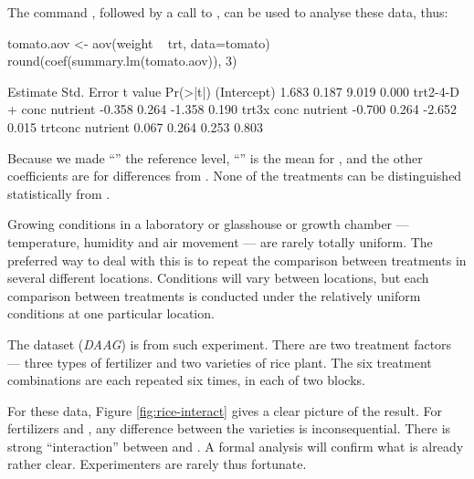 The command , followed by a call to ,
can be used to analyse these data, thus:
\begin{Schunk}
\begin{Sinput}
tomato.aov <- aov(weight ~ trt, data=tomato)
round(coef(summary.lm(tomato.aov)), 3)
\end{Sinput}
\end{Schunk}
\begin{fullwidth}

\begin{Schunk}
\begin{Soutput}
                         Estimate Std. Error t value Pr(>|t|)
(Intercept)                 1.683      0.187   9.019    0.000
trt2-4-D + conc nutrient   -0.358      0.264  -1.358    0.190
trt3x conc nutrient        -0.700      0.264  -2.652    0.015
trtconc nutrient            0.067      0.264   0.253    0.803
\end{Soutput}
\end{Schunk}

\end{fullwidth}
Because we made ``'' the reference level,
``'' is the mean for , and the
other coefficients are for differences from .  None
of the treatments can be distinguished statistically from .

Growing conditions in a laboratory or glasshouse or growth chamber ---
temperature, humidity and air movement --- are rarely totally
uniform. The preferred way to deal with this is to repeat the
comparison between treatments in several different
locations.  Conditions will vary between
locations, but each comparison between treatments is conducted under
the relatively uniform conditions at one particular location.

The dataset  ({\em DAAG}) is from such experiment.
There are two treatment factors ---  three types of fertilizer
and two varieties of rice plant.  The six treatment combinations
are each repeated six times, in each of two blocks.

For these data, Figure \ref{fig:rice-interact} gives a clear picture
of the result. For fertilizers  and , any difference
between the varieties is inconsequential.   There is strong ``interaction''
between  and .  A formal analysis will confirm
what is already rather clear.  Experimenters are rarely thus fortunate.

